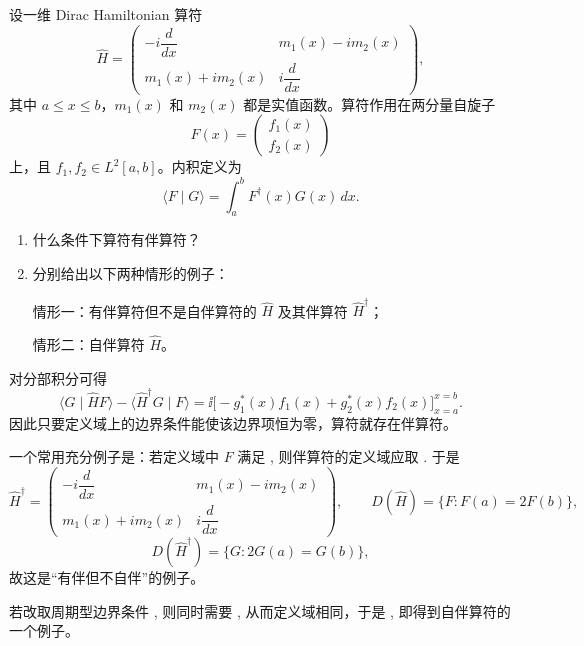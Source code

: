 \begin{question}[20分]

设一维 Dirac Hamiltonian 算符
\[
\hat H=
\begin{pmatrix}
-i\dfrac{d}{dx} & m_1(x)-im_2(x)\\[4pt]
m_1(x)+im_2(x) & i\dfrac{d}{dx}
\end{pmatrix},
\]
其中 $a\le x\le b$，$m_1(x)$ 和 $m_2(x)$ 都是实值函数。算符作用在两分量自旋子
\[
F(x)=\begin{pmatrix}f_1(x)\\ f_2(x)\end{pmatrix}
\]
上，且 $f_1,f_2\in L^2[a,b]$。内积定义为
\[
\langle F\mid G\rangle=\int_a^b F^{\dagger}(x)G(x)\,dx.
\]
\begin{enumerate}[label=(\arabic*),leftmargin=2.8em,itemsep=0.2em]
\item 什么条件下算符有伴算符？
\item 分别给出以下两种情形的例子：

情形一：有伴算符但不是自伴算符的 $\hat H$ 及其伴算符 $\hat H^{\dagger}$；

情形二：自伴算符 $\hat H$。
\end{enumerate}

\begin{solution}

对分部积分可得
\[
\langle G\mid \hat HF\rangle-\langle \hat H^{\dagger}G\mid F\rangle
=\ii\bigl[-g_1^*(x)f_1(x)+g_2^*(x)f_2(x)\bigr]_{x=a}^{x=b}.
\]
因此只要定义域上的边界条件能使该边界项恒为零，算符就存在伴算符。

一个常用充分例子是：若定义域中 $F$ 满足
,
则伴算符的定义域应取
.
于是
\[
\hat H^{\dagger}=
\begin{pmatrix}
-i\dfrac{d}{dx} & m_1(x)-im_2(x)\\[4pt]
m_1(x)+im_2(x) & i\dfrac{d}{dx}
\end{pmatrix},
\qquad D(\hat H)=\{F:F(a)=2F(b)\},
\]
\[
D(\hat H^{\dagger})=\{G:2G(a)=G(b)\},
\]
故这是“有伴但不自伴”的例子。

若改取周期型边界条件
,
则同时需要
,
从而定义域相同，于是
,
即得到自伴算符的一个例子。

\end{solution}
\end{question}

